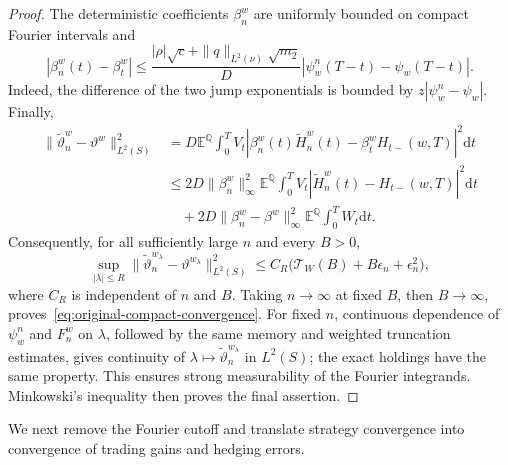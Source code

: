 \documentclass[11pt]{article}
\theoremstyle{definition}
\theoremstyle{remark}
\newcommand{\E}{\mathbb{E}}
\newcommand{\Q}{\mathbb{Q}}
\newcommand{\1}{\mathbf{1}}
\newcommand{\dd}{\mathrm{d}}
\begin{document}
\begin{proof}
The deterministic coefficients $\beta_n^w$ are uniformly bounded on
compact Fourier intervals and
\[
 |\beta_n^w(t)-\beta_t^w|
 \leq\frac{|\rho|\sqrt c+\|q\|_{L^2(\nu)}\sqrt{m_2}}{D}
       |\psi_w^n(T-t)-\psi_w(T-t)|.
\]
Indeed, the difference of the two jump exponentials is bounded by
$z|\psi_w^n-\psi_w|$. Finally,
\begin{align*}
 \|\widetilde\vartheta_n^w-\vartheta^w\|_{L^2(S)}^2
 &=D\E^\Q\int_0^T V_t
       |\beta_n^w(t)\widetilde H_n^w(t)-\beta_t^wH_{t-}(w,T)|^2\dd t\\
 &\leq 2D\|\beta_n^w\|_\infty^2
       \E^\Q\int_0^T V_t|\widetilde H_n^w(t)-H_{t-}(w,T)|^2\dd t\\
 &\quad+2D\|\beta_n^w-\beta^w\|_\infty^2
       \E^\Q\int_0^T W_t\dd t.
\end{align*}
Consequently, for all sufficiently large $n$ and every $B>0$,
\begin{equation}
\label{eq:original-weighted-error-bound}
 \sup_{|\lambda|\leq R}
 \|\widetilde\vartheta_n^{w_\lambda}-\vartheta^{w_\lambda}\|_{L^2(S)}^2
 \leq C_R\bigl(\mathcal T_W(B)+B\epsilon_n+\epsilon_n^2\bigr),
\end{equation}
where $C_R$ is independent of $n$ and $B$. Taking $n\to\infty$ at fixed
$B$, then $B\to\infty$, proves~\eqref{eq:original-compact-convergence}.
For fixed $n$, continuous dependence of $\psi_w^n$ and
$F_n^w$ on $\lambda$, followed by the same memory and weighted truncation
estimates, gives continuity of
$\lambda\mapsto\widetilde\vartheta_n^{w_\lambda}$ in $L^2(S)$; the exact
holdings have the same property. This ensures strong measurability of the
Fourier integrands. Minkowski's inequality then
proves the final assertion.
\end{proof}

We next remove the Fourier cutoff and translate strategy convergence into
convergence of trading gains and hedging errors.
\end{document}
